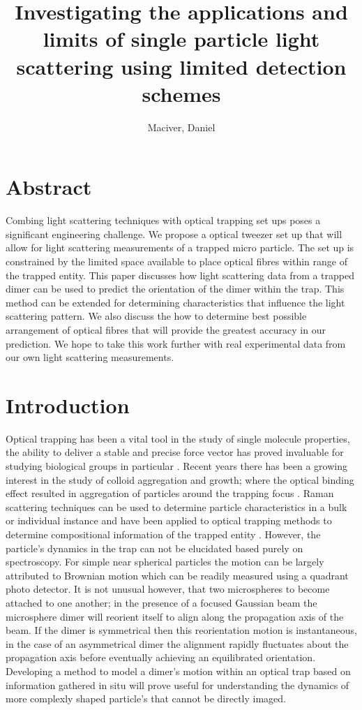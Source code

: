\documentclass[11pt]{article}
\title{Investigating the applications and limits of single particle light scattering using limited detection schemes}
\author{Maciver, Daniel}
\begin{document}
	
	\maketitle
	
	\section*{Abstract}
	Combing light scattering techniques with optical trapping set ups poses a significant engineering challenge. We propose a optical tweezer set up that will allow for light scattering measurements of a trapped micro particle. The set up is constrained by the limited space available to place optical fibres within range of the trapped entity. This paper discusses how light scattering data from a trapped dimer can be used to predict the orientation of the dimer within the trap. This method can be extended for determining characteristics that influence the light scattering pattern. We also discuss the how to determine best possible arrangement of optical fibres that will provide the greatest accuracy in our prediction. We hope to take this work further with real experimental data from our own light scattering measurements. 
	
	\section*{Introduction}
	Optical trapping has been a vital tool in the study of single molecule properties, the ability to deliver a stable and precise force vector has proved invaluable for studying biological groups in particular \cite{Biophysics_trapping}. Recent years there has been a growing interest in the study of colloid aggregation and growth; where the optical binding effect resulted in aggregation of particles around the trapping focus \cite{Colloids_and_tweezers}. Raman scattering techniques can be used to determine particle characteristics in a bulk or individual instance and have been applied to optical trapping methods to determine compositional information of the trapped entity \cite{Raman_Trapping,Raman_trapping_Biophysics}. However, the particle's dynamics in the trap can not be elucidated based purely on spectroscopy. For simple near spherical particles the motion can be largely attributed to Brownian motion which can be readily measured using a quadrant photo detector. It is not unusual however, that two microspheres to become attached to one another; in the presence of a focused Gaussian beam the microsphere dimer will reorient itself to align along the propagation axis of the beam. If the dimer is symmetrical then this reorientation motion is instantaneous, in the case of an asymmetrical dimer the alignment rapidly fluctuates about the propagation axis before eventually achieving an equilibrated orientation. Developing a method to model a dimer's motion within an optical trap based on information gathered in situ will prove useful for understanding the dynamics of more complexly shaped particle's that cannot be directly imaged.
	
\end{document}
